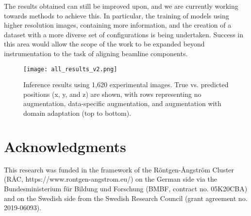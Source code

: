 \documentclass{iopconfser}
\begin{document}
The results obtained can still be improved upon, and we are currently working towards methods to achieve this. In particular, the training of models using higher resolution images, containing more information, and the creation of a dataset with a more diverse set of configurations is being undertaken. Success in this area would allow the scope of the work to be expanded beyond instrumentation to the task of aligning beamline components.

\begin{figure}[H]
    \centering
    \texttt{[image: all\_results\_v2.png]}
    \caption{Inference results using 1,620 experimental images. True vs. predicted positions (x, y, and z) are shown, with rows representing no augmentation, data-specific augmentation, and augmentation with domain adaptation (top to bottom).}
\label{results}
\end{figure}

\section{Acknowledgments}
This research was funded in the framework of the Röntgen-Ångström Cluster (RÅC, https://www.rontgen-angstrom.eu/) on the German side via the Bundesministerium für Bildung und Forschung (BMBF, contract no. 05K20CBA) and on the Swedish side from the Swedish Research Council (grant agreement no. 2019-06093).

\printbibliography
\end{document}

